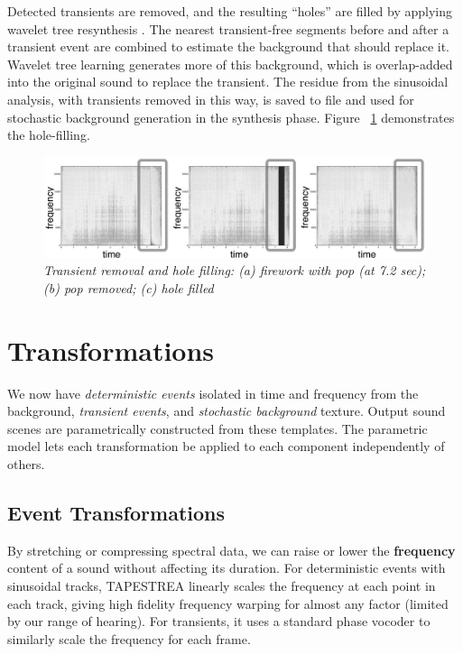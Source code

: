 \documentclass[twoside]{article}
\begin{document}
Detected transients are removed, and the resulting ``holes'' are filled by applying 
wavelet tree resynthesis \cite{paper:85:Dubnov02}. 
The nearest transient-free segments before and after a transient event are 
combined to estimate the background that should replace it. Wavelet tree 
learning generates more of this background, which is overlap-added into the original 
sound to replace the transient. The residue from the sinusoidal analysis, with transients 
removed in this way, is saved to file and used for stochastic background generation in the 
synthesis phase. Figure ~\ref{fig:transient} demonstrates the hole-filling. 
\begin{figure}[t]
\setlength\textfloatsep{0pt}
\setlength\abovecaptionskip{0pt}
\setlength\belowcaptionskip{0pt}
\centering
   \includegraphics[width=.48\textwidth]{transientb.jpg}
\caption{\it Transient removal and hole filling: (a) firework with pop 
(at 7.2 sec); (b) pop removed; (c) hole filled}
\label{fig:transient}
\end{figure}
\section{Transformations}

We now have \emph{deterministic events} isolated in time and frequency from 
the background, \emph{transient events}, and \emph{stochastic background} texture. 
Output sound scenes are parametrically constructed from these templates. The parametric model lets 
each transformation be applied to each component independently of others.

\subsection{Event Transformations}

By stretching or compressing spectral
data, we can raise or lower the \textbf{frequency} content of a sound without 
affecting its duration.  For deterministic events with sinusoidal tracks, 
TAPESTREA linearly scales the frequency at each point in each track, 
giving high fidelity frequency warping for almost any factor (limited by our 
range of hearing). For transients, it uses a standard phase vocoder \cite{paper:85:Dolson86} to 
similarly scale the frequency for each frame.  
\end{document}
